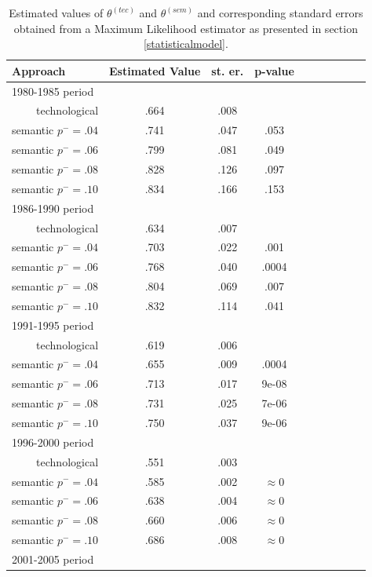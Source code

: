 \documentclass[12pt,twoside,a4paper]{article}
\begin{document}
\begin{table}[!ht]
\centering
\caption{\label{summary} Estimated values of $\theta^{(tec)}$ and $\theta^{(sem)}$ and corresponding standard errors obtained from a Maximum Likelihood estimator as presented in section \ref{statisticalmodel}.}
\label{stdQMLE}
\begin{tabular}{@{}rccccccccc@{}}
\toprule
\toprule
\multicolumn{1}{l}{Approach} & \multicolumn{1}{l}{Estimated Value} & \multicolumn{1}{l}{st. er.} & \multicolumn{1}{l}{p-value} \\ \toprule
\multicolumn{4}{l}{1980-1985 period} \\
technological & .664 &.008&\\
semantic $p^{-} = .04$ & .741 &.047 & .053\\
semantic $p^{-} = .06$ & .799 &.081 & .049\\
semantic $p^{-} = .08$ & .828 &.126 & .097\\
semantic $p^{-} = .10$ & .834 &.166 & .153\\
\multicolumn{4}{l}{1986-1990 period} \\
technological & .634 &.007&\\
semantic $p^{-} = .04$ & .703 &.022 & .001\\
semantic $p^{-} = .06$ & .768 &.040 & .0004\\
semantic $p^{-} = .08$ & .804 &.069 & .007\\
semantic $p^{-} = .10$ & .832 &.114 & .041\\
\multicolumn{4}{l}{1991-1995 period} \\
technological & .619 &.006&\\
semantic $p^{-} = .04$ & .655 &.009 & .0004\\
semantic $p^{-} = .06$ & .713 &.017 & 9e-08\\
semantic $p^{-} = .08$ & .731 &.025 & 7e-06\\
semantic $p^{-} = .10$ & .750 &.037 & 9e-06\\
\multicolumn{4}{l}{1996-2000 period} \\
technological & .551 &.003&\\
semantic $p^{-} = .04$ & .585 &.002 & $\approx 0$\\
semantic $p^{-} = .06$ & .638 &.004 & $\approx 0$\\
semantic $p^{-} = .08$ & .660 &.006 & $\approx 0$\\
semantic $p^{-} = .10$ & .686 &.008 & $\approx 0$\\
\multicolumn{4}{l}{2001-2005 period} \\

\end{tabular}
\end{table}
\end{document}
